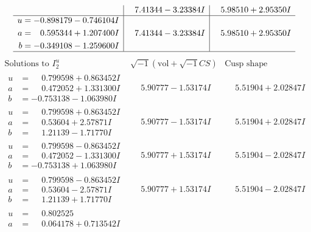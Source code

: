 \documentclass[1p]{elsarticle_modified}
\theoremstyle{definition}
\newcommand{\I}{\sqrt{-1}}
\begin{document}
$$\begin{array}{c|c|c}
 & \phantom{-}7.41344 - 3.23384 I & \phantom{-}5.98510 + 2.95350 I \\ \hline\begin{aligned}
u &= -0.898179 - 0.746104 I \\
a &= \phantom{-}0.595344 + 1.207400 I \\
b &= -0.349108 - 1.259600 I\end{aligned}
 & \phantom{-}7.41344 - 3.23384 I & \phantom{-}5.98510 + 2.95350 I\\
 \hline 
 \end{array}$$\newpage$$\begin{array}{c|c|c}  
\text{Solutions to }I^u_{2}& \I (\text{vol} + \sqrt{-1}CS) & \text{Cusp shape}\\
 \hline 
\begin{aligned}
u &= \phantom{-}0.799598 + 0.863452 I \\
a &= \phantom{-}0.472052 + 1.331300 I \\
b &= -0.753138 - 1.063980 I\end{aligned}
 & \phantom{-}5.90777 - 1.53174 I & \phantom{-}5.51904 + 2.02847 I \\ \hline\begin{aligned}
u &= \phantom{-}0.799598 + 0.863452 I \\
a &= \phantom{-}0.53604 + 2.57871 I \\
b &= \phantom{-}1.21139 - 1.71770 I\end{aligned}
 & \phantom{-}5.90777 - 1.53174 I & \phantom{-}5.51904 + 2.02847 I \\ \hline\begin{aligned}
u &= \phantom{-}0.799598 - 0.863452 I \\
a &= \phantom{-}0.472052 - 1.331300 I \\
b &= -0.753138 + 1.063980 I\end{aligned}
 & \phantom{-}5.90777 + 1.53174 I & \phantom{-}5.51904 - 2.02847 I \\ \hline\begin{aligned}
u &= \phantom{-}0.799598 - 0.863452 I \\
a &= \phantom{-}0.53604 - 2.57871 I \\
b &= \phantom{-}1.21139 + 1.71770 I\end{aligned}
 & \phantom{-}5.90777 + 1.53174 I & \phantom{-}5.51904 - 2.02847 I \\ \hline\begin{aligned}
u &= \phantom{-}0.802525\phantom{ +0.000000I} \\
a &= \phantom{-}0.064178 + 0.713542 I \\

\end{aligned}
\end{array}$$
\end{document}

